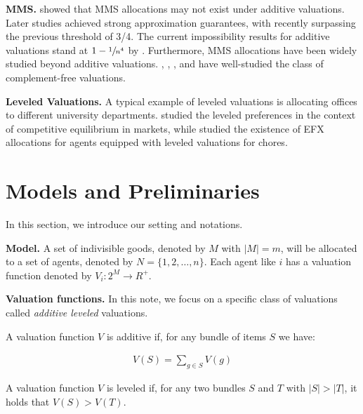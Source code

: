\documentclass{article}
\theoremstyle{definition}
\begin{document}
\textbf{MMS.}
\cite{10.1145/3140756} showed that MMS allocations may not exist under additive valuations. Later studies achieved strong approximation guarantees, with \cite{akrami2023breaking34barrierapproximate} recently surpassing the previous threshold of 3/4. The current impossibility results for additive valuations stand at $1 - \sfrac{1}{n^4}$ by \cite{feige2021tightnegativeexamplemms}. Furthermore, MMS allocations have been widely studied beyond additive valuations. \cite{DBLP:journals/corr/BarmanM17}, \cite{uziahu2023fairallocationindivisiblegoods}, \cite{10.1016/j.artint.2021.103633}, and \cite{10.1016/j.artint.2023.104049} have well-studied the class of complement-free valuations.

\textbf{Leveled Valuations.}
A typical example of leveled valuations is allocating offices to different university departments. \cite{DBLP:journals/corr/BabaioffNT17} studied the leveled preferences in the context of competitive equilibrium in markets, while \cite{DBLP:journals/corr/abs-2109-08671} studied the existence of EFX allocations for agents equipped with leveled valuations for chores.


\section{Models and Preliminaries}

In this section, we introduce our setting and notations.

\textbf{Model.} A set of indivisible goods, denoted by $M$ with $|M| = m$, will be allocated to a set of agents, denoted by $N = \{1, 2, \ldots, n\}$. Each agent like $i$ has a valuation function denoted by $V_i : 2^M \rightarrow R^{+}$.

\textbf{Valuation functions.} In this note, we focus on a specific class of valuations called \emph{additive leveled} valuations. 

\begin{definition}
    A valuation function $V$ is additive if, for any bundle of items $S$ we have:

    \begin{align*}
        V(S) = \sum\limits_{g \in S} V({g})
    \end{align*}
    
\end{definition}



\begin{definition}
    A valuation function $V$ is leveled if, for any two bundles $S$ and $T$ with $|S| > |T|$, it holds that $V(S) > V(T)$.
\end{definition}
\end{document}
